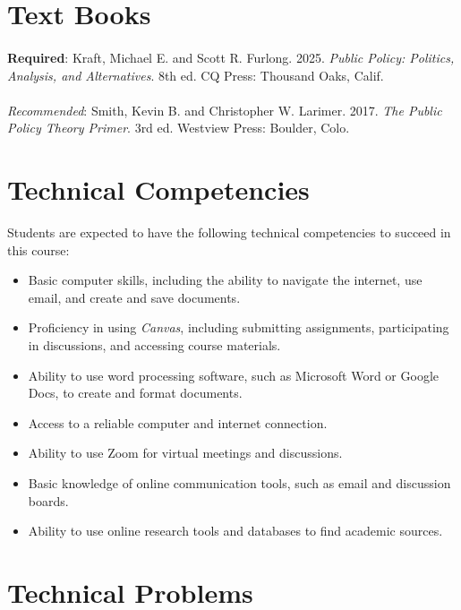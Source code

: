 \documentclass[12pt, letterpaper]{article}
\begin{document}
\section{Text Books}


\paragraph{}\noindent \textbf{Required}: Kraft, Michael E. and Scott R. Furlong. 2025. \emph{Public Policy: Politics, Analysis, and Alternatives}. 8th ed. CQ Press: Thousand Oaks, Calif.

\paragraph{}\noindent \emph{Recommended}: Smith, Kevin B. and Christopher W. Larimer. 2017. \emph{The Public Policy Theory Primer}. 3rd ed. Westview Press: Boulder, Colo.

\section{Technical Competencies}

Students are expected to have the following technical competencies to succeed in this course:
\begin{itemize}
    \item Basic computer skills, including the ability to navigate the internet, use email, and create and save documents.
    \item Proficiency in using \emph{Canvas}, including submitting assignments, participating in discussions, and accessing course materials.
    \item Ability to use word processing software, such as Microsoft Word or Google Docs, to create and format documents.
    \item Access to a reliable computer and internet connection.
    \item Ability to use Zoom for virtual meetings and discussions.
    \item Basic knowledge of online communication tools, such as email and discussion boards.
    \item Ability to use online research tools and databases to find academic sources.
\end{itemize}

\section{Technical Problems}
\end{document}
